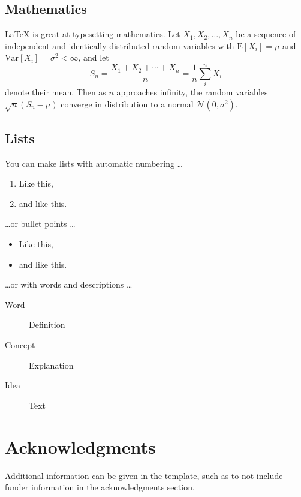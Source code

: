 \documentclass[fleqn,10pt]{olplainarticle}
\begin{document}
\subsection*{Mathematics}

\LaTeX{} is great at typesetting mathematics. Let $X_1, X_2, \ldots, X_n$ be a sequence of independent and identically distributed random variables with $\text{E}[X_i] = \mu$ and $\text{Var}[X_i] = \sigma^2 < \infty$, and let
$$S_n = \frac{X_1 + X_2 + \cdots + X_n}{n}
      = \frac{1}{n}\sum_{i}^{n} X_i$$
denote their mean. Then as $n$ approaches infinity, the random variables $\sqrt{n}(S_n - \mu)$ converge in distribution to a normal $\mathcal{N}(0, \sigma^2)$.

\subsection*{Lists}

You can make lists with automatic numbering \dots

\begin{enumerate}[noitemsep] 
\item Like this,
\item and like this.
\end{enumerate}
\dots or bullet points \dots
\begin{itemize}[noitemsep] 
\item Like this,
\item and like this.
\end{itemize}
\dots or with words and descriptions \dots
\begin{description}
\item[Word] Definition
\item[Concept] Explanation
\item[Idea] Text
\end{description}

\section*{Acknowledgments}

Additional information can be given in the template, such as to not include funder information in the acknowledgments section.


\end{document}
